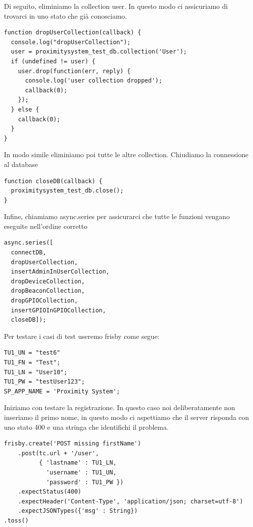 Di seguito, eliminiamo la collection user. 
In questo modo ci assicuriamo di trovarci in uno stato che già conosciamo.

\begin{lstlisting}[caption={test/config/setup\_tests.js - dropUserCollection}, style=javaScriptCode]
function dropUserCollection(callback) {
  console.log("dropUserCollection");
  user = proximitysystem_test_db.collection('User');
  if (undefined != user) {
    user.drop(function(err, reply) {
      console.log('user collection dropped');
      callback(0);
    });
  } else {
    callback(0);
  }
}
\end{lstlisting}

In modo simile eliminiamo poi tutte le altre collection.
Chiudiamo la connessione al database

\begin{lstlisting}[caption={test/config/setup\_tests.js - closeDB}, style=javaScriptCode]
function closeDB(callback) {
  proximitysystem_test_db.close();
}
\end{lstlisting}

Infine, chiamiamo async.series per assicurarci che tutte le funzioni vengano eseguite nell’ordine corretto

\begin{lstlisting}[caption={test/config/setup\_tests.js - async}, style=javaScriptCode]
async.series([
  connectDB,
  dropUserCollection,
  insertAdminInUserCollection,
  dropDeviceCollection,
  dropBeaconCollection,
  dropGPIOCollection,
  insertGPIOInGPIOCollection,
  closeDB]);
\end{lstlisting}

Per testare i casi di test useremo frisby come segue:

\begin{lstlisting}[caption={test/user/create\_accounts\_error\_spec.js}, style=javaScriptCode]
TU1_UN = "test6"
TU1_FN = "Test";
TU1_LN = "User10";
TU1_PW = "testUser123";
SP_APP_NAME = 'Proximity System';
\end{lstlisting}

Iniziamo con testare la registrazione. 
In questo caso noi deliberatamente non inseriamo il primo nome, in questo modo ci aspettiamo che il server risponda con uno stato 400 
e una stringa che identifichi il problema.

\begin{lstlisting}[caption={test/user/create\_accounts\_error\_spec.js}, style=javaScriptCode]
frisby.create('POST missing firstName')
    .post(tc.url + '/user',
          { 'lastname' : TU1_LN,
            'username' : TU1_UN,
            'password' : TU1_PW })
    .expectStatus(400)
    .expectHeader('Content-Type', 'application/json; charset=utf-8')
    .expectJSONTypes({'msg' : String})
.toss()
\end{lstlisting}

